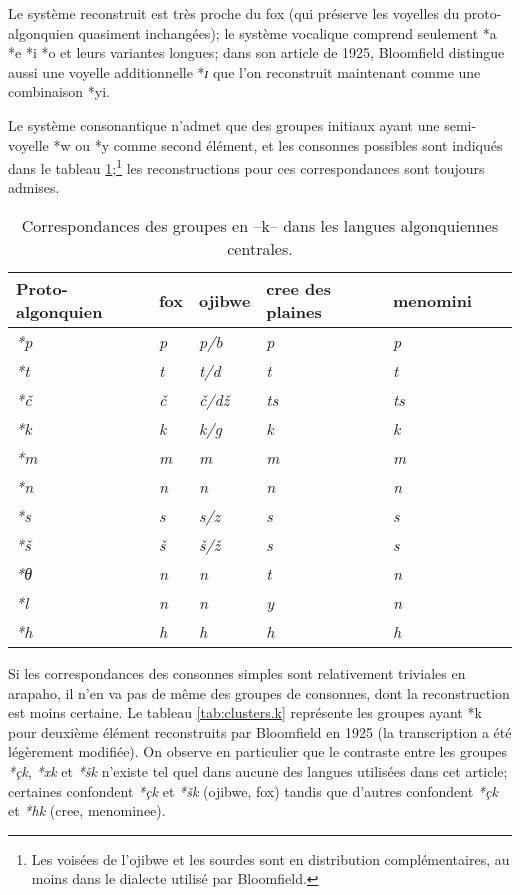 \documentclass[twoside,a4paper,11pt]{article}
\newcommand{\ipa}[1]{{\phon\textit{#1}}}
\newcommand{\Σ}{\greek{Σ}}
\begin{document}
Le système reconstruit est très proche du fox (qui préserve les voyelles du proto-algonquien quasiment inchangées); le système vocalique comprend seulement *a *e *i *o et leurs variantes longues; dans son article de 1925, Bloomfield distingue aussi une voyelle additionnelle *\ipa{ɪ} que l'on reconstruit maintenant comme une combinaison *yi.

Le système consonantique n'admet que des groupes initiaux ayant une semi-voyelle *w ou *y comme second élément, et les consonnes possibles sont indiqués dans le tableau \ref{tab:c.simple};\footnote{Les voisées de l'ojibwe et les sourdes sont en distribution complémentaires, au moins dans le dialecte utilisé par Bloomfield.} les reconstructions pour ces correspondances sont toujours admises.

\begin{table}[h]
\caption{Correspondances des groupes en --k-- dans les langues algonquiennes centrales.} \centering  \label{tab:c.simple}
\begin{tabular}{lllllll}
\toprule
Proto-algonquien & fox & ojibwe & cree des plaines & menomini \\
\midrule
\ipa{*p} & 	\ipa{p} & 	\ipa{p/b} & 	\ipa{p} & 	\ipa{p} & 	\\
\ipa{*t} & 	\ipa{t} & 	\ipa{t/d} & 	\ipa{t} & 	\ipa{t} & 	\\
\ipa{*č} & 	\ipa{č} & 	\ipa{č/dž} & 	\ipa{ts} & 	\ipa{ts} & 	\\
\ipa{*k} & 	\ipa{k} & 	\ipa{k/g} & 	\ipa{k} & 	\ipa{k} & 	\\
\ipa{*m} & 	\ipa{m} & 	\ipa{m} & 	\ipa{m} & 	\ipa{m} & 	\\
\ipa{*n} & 	\ipa{n} & 	\ipa{n} & 	\ipa{n} & 	\ipa{n} & 	\\
\ipa{*s} & 	\ipa{s} & 	\ipa{s/z} & 	\ipa{s} & 	\ipa{s} & 	\\
\ipa{*š} & 	\ipa{š} & 	\ipa{š/ž} & 	\ipa{s} & 	\ipa{s} & 	\\
\ipa{*θ} & 	\ipa{n} & 	\ipa{n} & 	\ipa{t} & 	\ipa{n} & 	\\
\ipa{*l} & 	\ipa{n} & 	\ipa{n} & 	\ipa{y} & 	\ipa{n} & 	\\
\ipa{*h} & 	\ipa{h} & 	\ipa{h} & 	\ipa{h} & 	\ipa{h} & 	\\
\bottomrule
\end{tabular}
\end{table}

Si les correspondances des consonnes simples sont relativement triviales en arapaho, il n'en va pas de même des groupes de consonnes, dont la reconstruction est moins certaine. Le tableau \ref{tab:clusters.k} représente les groupes ayant *k pour deuxième élément reconstruits par Bloomfield en 1925 (la transcription a été légèrement modifiée). On observe en particulier que le contraste entre les  groupes  \ipa{*çk}, \ipa{*xk} et \ipa{*šk} n'existe tel quel dans aucune des langues utilisées dans cet article; certaines confondent \ipa{*çk}  et \ipa{*šk} (ojibwe, fox) tandis que d'autres confondent \ipa{*çk}  et \ipa{*hk} (cree, menominee).
 
\end{document}
